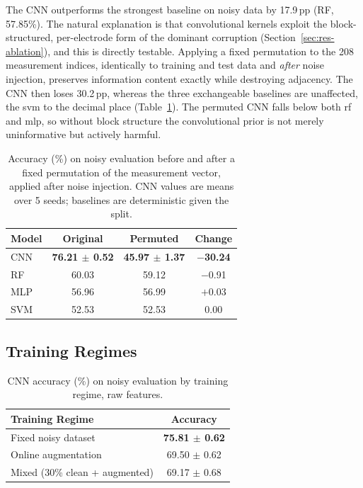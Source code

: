 The CNN outperforms the strongest baseline on noisy data by 17.9\,pp (RF, 57.85\%). The natural explanation is that convolutional kernels exploit the block-structured, per-electrode form of the dominant corruption (Section~\ref{sec:res-ablation}), and this is directly testable. Applying a fixed permutation to the 208 measurement indices, identically to training and test data and \emph{after} noise injection, preserves information content exactly while destroying adjacency. The CNN then loses 30.2\,pp, whereas the three exchangeable baselines are unaffected, the \gls{svm} to the decimal place (Table~\ref{tab:permutation}). The permuted CNN falls below both \gls{rf} and \gls{mlp}, so without block structure the convolutional prior is not merely uninformative but actively harmful.

\begin{table}[htbp]
\centering
\caption[Permutation ablation]{Accuracy (\%) on noisy evaluation before and after a fixed permutation of the measurement vector, applied after noise injection. CNN values are means over 5 seeds; baselines are deterministic given the split.}
\label{tab:permutation}
\small
\setlength{\tabcolsep}{8pt}
\begin{tabular}{@{}lccc@{}}
\toprule
\textbf{Model} & \textbf{Original} & \textbf{Permuted} & \textbf{Change} \\
\midrule
CNN & \textbf{76.21 $\pm$ 0.52} & \textbf{45.97 $\pm$ 1.37} & \textbf{$-$30.24} \\
RF  & 60.03 & 59.12 & $-$0.91 \\
MLP & 56.96 & 56.99 & $+$0.03 \\
SVM & 52.53 & 52.53 & 0.00 \\
\bottomrule
\end{tabular}
\end{table}

\subsection{Training Regimes}
\label{sec:res-regimes}

\begin{table}[htbp]
\centering
\caption[CNN accuracy on noisy evaluation by training regime]{CNN accuracy (\%) on noisy evaluation by training regime, raw features.}
\label{tab:augmented-results}
\small
\begin{tabular}{@{}lc@{}}
\toprule
\textbf{Training Regime} & \textbf{Accuracy} \\
\midrule
Fixed noisy dataset            & \textbf{75.81 $\pm$ 0.62} \\
Online augmentation            & 69.50 $\pm$ 0.62 \\
Mixed (30\% clean + augmented) & 69.17 $\pm$ 0.68 \\
\bottomrule
\end{tabular}
\end{table}

